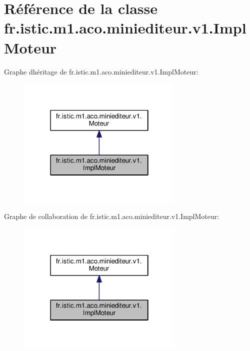 \hypertarget{classfr_1_1istic_1_1m1_1_1aco_1_1miniediteur_1_1v1_1_1ImplMoteur}{}\section{Référence de la classe fr.\+istic.\+m1.\+aco.\+miniediteur.\+v1.\+Impl\+Moteur}
\label{classfr_1_1istic_1_1m1_1_1aco_1_1miniediteur_1_1v1_1_1ImplMoteur}


Graphe d\textquotesingle{}héritage de fr.\+istic.\+m1.\+aco.\+miniediteur.\+v1.\+Impl\+Moteur\+:
\nopagebreak
\begin{figure}[H]
\begin{center}
\leavevmode
\includegraphics[width=226pt]{classfr_1_1istic_1_1m1_1_1aco_1_1miniediteur_1_1v1_1_1ImplMoteur__inherit__graph}
\end{center}
\end{figure}


Graphe de collaboration de fr.\+istic.\+m1.\+aco.\+miniediteur.\+v1.\+Impl\+Moteur\+:
\nopagebreak
\begin{figure}[H]
\begin{center}
\leavevmode
\includegraphics[width=226pt]{classfr_1_1istic_1_1m1_1_1aco_1_1miniediteur_1_1v1_1_1ImplMoteur__coll__graph}
\end{center}
\end{figure}

